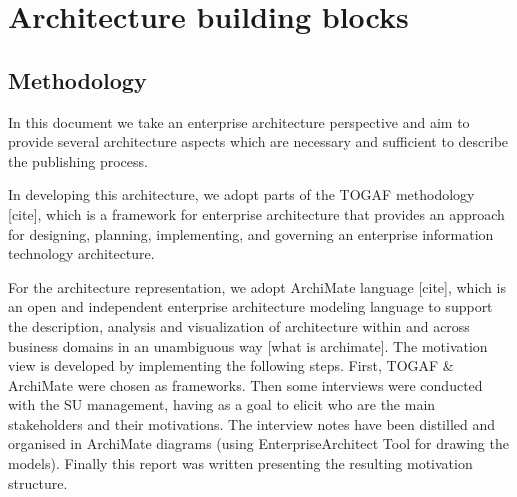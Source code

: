 \section{Architecture building blocks}
\label{sec:building-blocks}


	\subsection{Methodology}
	
	In this document we take an enterprise architecture perspective and aim to provide several architecture aspects which are necessary and sufficient to describe the publishing process. 
	
	In developing this architecture, we adopt parts of the TOGAF methodology [cite], which is a framework for enterprise architecture that provides an approach for designing, planning, implementing, and governing an enterprise information technology architecture. 
	
	For the architecture representation, we adopt ArchiMate language [cite], which is an open and independent enterprise architecture modeling language to support the description, analysis and visualization of architecture within and across business domains in an unambiguous way [what is archimate].
	The motivation view is developed by implementing  the following steps. First, TOGAF \& ArchiMate were chosen as frameworks. Then some interviews were conducted with the SU management, having as a goal to elicit who are the main stakeholders and their motivations. The interview notes have been distilled and organised in ArchiMate diagrams (using EnterpriseArchitect Tool for drawing the models). Finally this report was written presenting the resulting motivation structure. 
	